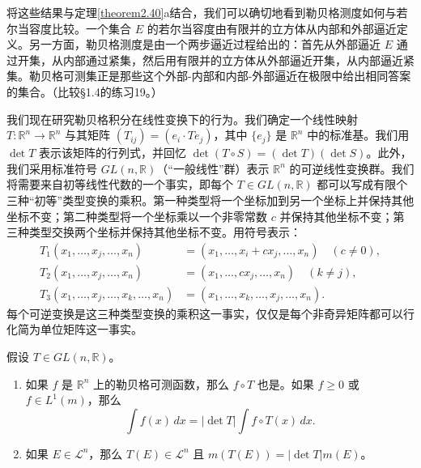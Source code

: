 \documentclass[lang=cn,10pt,thmcnt=section]{elegantbook}
\begin{document}
将这些结果与定理\ref{theorem2.40}a结合，我们可以确切地看到勒贝格测度如何与若尔当容度比较。一个集合 $E$ 的若尔当容度由有限并的立方体从内部和外部逼近定义。另一方面，勒贝格测度是由一个两步逼近过程给出的：首先从外部逼近 $E$ 通过开集，从内部通过紧集，然后用有限并的立方体从外部逼近开集，从内部逼近紧集。勒贝格可测集正是那些这个外部-内部和内部-外部逼近在极限中给出相同答案的集合。（比较§1.4的练习19。）

我们现在研究勒贝格积分在线性变换下的行为。我们确定一个线性映射 $T : \mathbb{R}^n \to \mathbb{R}^n$ 与其矩阵 $(T_{ij}) = (e_i \cdot T e_j)$，其中 $\{e_j\}$ 是 $\mathbb{R}^n$ 中的标准基。我们用 $\det T$ 表示该矩阵的行列式，并回忆 $\det(T \circ S) = (\det T)(\det S)$。此外，我们采用标准符号 $GL(n,\mathbb{R})$（“一般线性”群）表示 $\mathbb{R}^n$ 的可逆线性变换群。我们将需要来自初等线性代数的一个事实，即每个 $T \in GL(n,\mathbb{R})$ 都可以写成有限个三种“初等”类型变换的乘积。第一种类型将一个坐标加到另一个坐标上并保持其他坐标不变；第二种类型将一个坐标乘以一个非零常数 $c$ 并保持其他坐标不变；第三种类型交换两个坐标并保持其他坐标不变。用符号表示：
\begin{align*}
    T_1(x_1, \ldots, x_j, \ldots, x_n) &= (x_1, \ldots, x_i+cx_j, \ldots, x_n) \quad (c \neq 0), \\
    T_2(x_1, \ldots, x_j, \ldots, x_n) &= (x_1, \ldots, cx_j, \ldots, x_n) \quad (k \neq j), \\
    T_3(x_1, \ldots, x_j, \ldots, x_k, \ldots, x_n) &= (x_1, \ldots, x_k, \ldots, x_j, \ldots, x_n).
\end{align*}
每个可逆变换是这三种类型变换的乘积这一事实，仅仅是每个非奇异矩阵都可以行化简为单位矩阵这一事实。

\begin{theorem}\label{theorem2.44}
假设 $T \in GL(n,\mathbb{R})$。
\begin{enumerate}[label=\alph*.]
\item 如果 $f$ 是 $\mathbb{R}^n$ 上的勒贝格可测函数，那么 $f \circ T$ 也是。如果 $f \ge 0$ 或 $f \in L^1(m)$，那么
\begin{equation}\label{equation2.45}
\int f(x) \,dx = |\det T| \int f \circ T(x) \,dx.
\end{equation}
\item 如果 $E \in \mathcal{L}^n$，那么 $T(E) \in \mathcal{L}^n$ 且 $m(T(E)) = |\det T|m(E)$。
\end{enumerate}
\end{theorem}
\end{document}
